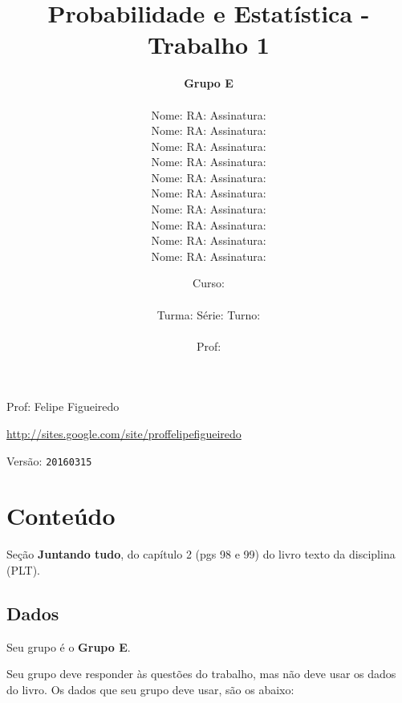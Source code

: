 \documentclass[a4paper]{article}
\date{
\bigskip
Curso: \underline{\hspace{8cm}}\\
\ \\
Turma: \underline{\hspace{1cm}} Série: \underline{\hspace{1cm}} Turno:
\underline{\hspace{1cm}}\\
\ \\
Prof: \underline{\hspace{8cm}}\\
}
\title{Probabilidade e Estatística - Trabalho 1}
\author{
{\bf Grupo E}\\
\ \\
Nome: \underline{\hspace{6cm}} RA: \underline{\hspace{2cm}} Assinatura: \underline{\hspace{4cm}}\\
Nome: \underline{\hspace{6cm}} RA: \underline{\hspace{2cm}} Assinatura: \underline{\hspace{4cm}}\\
Nome: \underline{\hspace{6cm}} RA: \underline{\hspace{2cm}} Assinatura: \underline{\hspace{4cm}}\\
Nome: \underline{\hspace{6cm}} RA: \underline{\hspace{2cm}} Assinatura: \underline{\hspace{4cm}}\\
Nome: \underline{\hspace{6cm}} RA: \underline{\hspace{2cm}} Assinatura: \underline{\hspace{4cm}}\\
Nome: \underline{\hspace{6cm}} RA: \underline{\hspace{2cm}} Assinatura: \underline{\hspace{4cm}}\\
Nome: \underline{\hspace{6cm}} RA: \underline{\hspace{2cm}} Assinatura: \underline{\hspace{4cm}}\\
Nome: \underline{\hspace{6cm}} RA: \underline{\hspace{2cm}} Assinatura: \underline{\hspace{4cm}}\\
Nome: \underline{\hspace{6cm}} RA: \underline{\hspace{2cm}} Assinatura: \underline{\hspace{4cm}}\\
Nome: \underline{\hspace{6cm}} RA: \underline{\hspace{2cm}} Assinatura: \underline{\hspace{4cm}}\\
}
\begin{document}
\maketitle
\newpage

\parbox[c]{.825\textwidth}{\raggedright%
{Prof: Felipe Figueiredo\par}
{\url{http://sites.google.com/site/proffelipefigueiredo}\par}
}

Versão: \verb|20160315|




\section{Conteúdo}

Seção {\bf Juntando tudo}, do capítulo 2 (pgs 98 e 99) do livro texto da disciplina (PLT). 

\subsection{Dados}
Seu grupo é o {\bf Grupo E}.

Seu grupo deve responder às questões do trabalho, mas não deve usar os dados do livro. Os dados que seu grupo deve usar, são os abaixo:
\end{document}
